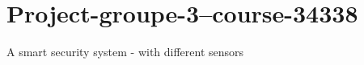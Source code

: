 \chapter{Project-\/groupe-\/3--course-\/34338}
\hypertarget{md__r_e_a_d_m_e}{}\label{md__r_e_a_d_m_e}
\label{md__r_e_a_d_m_e_autotoc_md0}%
%


A smart security system -\/ with different sensors 